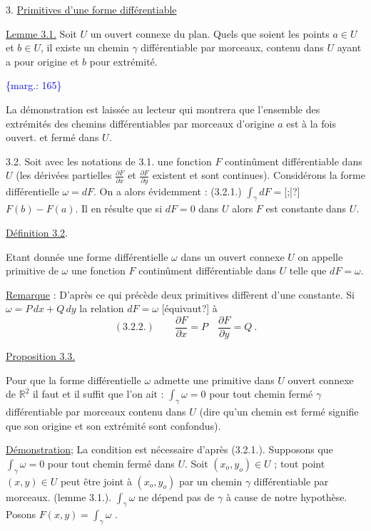 \documentclass[11pt]{article}
\newcommand{\scanpage}[1]{\par\bigskip\noindent{\small\sffamily[scan #1]}\par}
\newcommand{\mspage}[1]{{\small\sffamily[p.\,#1]}}
\newcommand{\margin}[1]{\textcolor{blue}{\{\textsf{marg.:} #1\}}}
\newcommand{\uline}[1]{\underline{#1}}
\newcommand{\unsure}[1]{[#1?]}
\begin{document}
3. \uline{Primitives d'une forme différentiable}

\uline{Lemme 3.1.} Soit $U$ un ouvert connexe du plan. Quels que soient les points
$a \in U$ et $b \in U$, il existe un chemin $\gamma$ différentiable par morceaux, contenu
dans $U$ ayant a pour origine et $b$ pour extrémité.

\margin{165}

\clearpage
\scanpage{119/166}
\mspage{- 5 -}

La démonstration est laissée au lecteur qui montrera que l'ensemble
des extrémités des chemins différentiables par morceaux d'origine $a$ est à
la fois ouvert. et fermé dans $U$.

3.2. Soit avec les notations de 3.1. une fonction $F$ continûment différentiable
dans $U$ (les dérivées partielles $\frac{\partial F}{\partial x}$ et $\frac{\partial F}{\partial y}$ existent et sont continues).
Considérons la forme différentielle $\omega = dF$. On a alors évidemment :
(3.2.1.) $\int_{\gamma} dF =$\unsure{;|}$F(b) - F(a)$. Il en résulte que si $dF = 0$ dans $U$
alors $F$ est constante dans $U$.

\uline{Définition 3.2}.

Etant donnée une forme différentielle $\omega$ dans un ouvert connexe $U$
on appelle primitive de $\omega$ une fonction $F$ continûment différentiable dans $U$
telle que $dF = \omega$.

\uline{Remarque} : D'après ce qui précède deux primitives diffèrent d'une constante.
Si $\omega = P\,dx + Q\,dy$ la relation $dF = \omega$ \unsure{équivaut} à
\[ (3.2.2.) \qquad \frac{\partial F}{\partial x} = P \quad \frac{\partial F}{\partial y} = Q \ . \]

\uline{Proposition 3.3.}

Pour que la forme différentielle $\omega$ admette une primitive dans $U$
ouvert connexe de $\mathbb{R}^2$ il faut et il suffit que l'on ait : $\int_{\gamma} \omega = 0$ pour
tout chemin fermé $\gamma$ différentiable par morceaux contenu dans $U$ (dire qu'un
chemin est fermé signifie que son origine et son extrémité sont confondus).

\uline{Démonstration}; La condition est nécessaire d'après (3.2.1.). Supposons que
$\int_{\gamma} \omega = 0$ pour tout chemin fermé dans $U$. Soit $(x_o,y_o) \in U$ ; tout point
$(x,y) \in U$ peut être joint à $(x_o,y_o)$ par un chemin $\gamma$ différentiable par
morceaux. (lemme 3.1.). $\int_{\gamma} \omega$ ne dépend pas de $\gamma$ à cause de notre hypothèse.
Posons $F(x,y) = \int_{\gamma} \omega$ .
\end{document}
